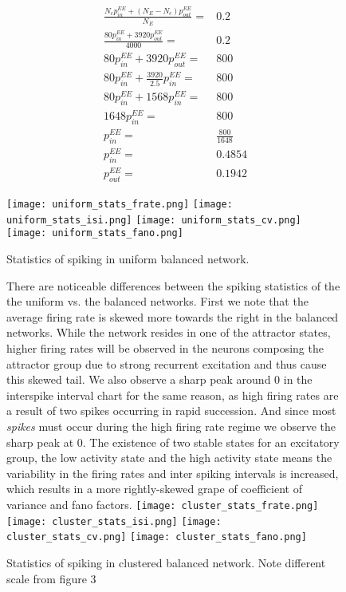 \documentclass[10pt]{article}
\begin{document}
\begin{align*}
\frac{N_cp^{EE}_{in} + (N_E - N_c)p^{EE}_{out}}{N_E} =& 0.2
\\
\frac{80p^{EE}_{in} + 3920p^{EE}_{out}}{4000} = &0.2
\\
80p^{EE}_{in} + 3920p^{EE}_{out} = &800
\\
80p^{EE}_{in} + \frac{3920}{2.5}p^{EE}_{in} = &800
\\
80p^{EE}_{in} + 1568p^{EE}_{in} = &800
\\
1648p^{EE}_{in} = &800
\\
p^{EE}_{in} = &\frac{800}{1648}
\\
p^{EE}_{in} = &0.4854
\\
p^{EE}_{out} = &0.1942
\end{align*}



\begin{figure}[h!]
  \centering
    \texttt{[image: uniform\_stats\_frate.png]}
     \texttt{[image: uniform\_stats\_isi.png]}
    \texttt{[image: uniform\_stats\_cv.png]}
     \texttt{[image: uniform\_stats\_fano.png]}
      \caption{Statistics of spiking in uniform balanced network.}
\end{figure}

\begin{figure}[h!]
   There are noticeable differences between the spiking statistics of the the uniform vs. the balanced networks. First we note that the average firing rate is skewed more towards the right in the balanced networks. While the network resides in one of the attractor states, higher firing rates will be observed in the neurons composing the attractor group due to strong recurrent excitation and thus cause this skewed tail. We also observe a sharp peak around 0 in the interspike interval chart for the same reason, as high firing rates are a result of two spikes occurring in rapid succession. And since most \emph{spikes} must occur during the high firing rate regime we observe the sharp peak at 0. The existence of two stable states for an excitatory group, the low activity state and the high activity state means the variability in the firing rates and inter spiking intervals is increased, which results in a more rightly-skewed grape of coefficient of variance and fano factors. 
    \texttt{[image: cluster\_stats\_frate.png]}
     \texttt{[image: cluster\_stats\_isi.png]}
    \texttt{[image: cluster\_stats\_cv.png]}
     \texttt{[image: cluster\_stats\_fano.png]}
      \caption{Statistics of spiking in clustered balanced network. Note different scale from figure 3}
\end{figure}
\end{document}
